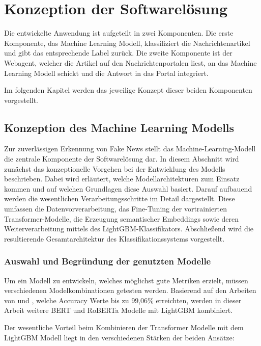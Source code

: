 \chapter{Konzeption der Softwarelösung}
\label{chap:konzeption_der_softwareloesung}

Die entwickelte Anwendung ist aufgeteilt in zwei Komponenten. Die erste Komponente, das Machine Learning Modell,
klassifiziert die Nachrichtenartikel und gibt das entsprechende Label zurück. Die zweite Komponente ist der Webagent, welcher
die Artikel auf den Nachrichtenportalen liest, an das Machine Learning Modell schickt und die Antwort in das Portal integriert.

Im folgenden Kapitel werden das jeweilige Konzept dieser beiden Komponenten vorgestellt.

\section{Konzeption des Machine Learning Modells} \label{sec:06:machine_learning_model}

Zur zuverlässigen Erkennung von Fake News stellt das Machine-Learning-Modell die zentrale Komponente der Softwarelösung dar.
In diesem Abschnitt wird zunächst das konzeptionelle Vorgehen bei der Entwicklung des Modells beschrieben. Dabei wird erläutert, welche Modellarchitekturen zum Einsatz kommen und 
auf welchen Grundlagen diese Auswahl basiert.
Darauf aufbauend werden die wesentlichen Verarbeitungsschritte im Detail dargestellt. Diese umfassen die Datenvorverarbeitung, 
das Fine-Tuning der vortrainierten Transformer-Modelle, die Erzeugung semantischer Embeddings sowie deren Weiterverarbeitung mittels des LightGBM-Klassifikators. 
Abschließend wird die resultierende Gesamtarchitektur des Klassifikationssystems vorgestellt.

\subsection{Auswahl und Begründung der genutzten Modelle} 

Um ein Modell zu entwickeln, welches möglichst gute Metriken erzielt, müssen verschiedenen Modelkombinationen getesten werden.
Basierend auf den Arbeiten von \cite{Essa:2023aa} und \cite{V_G_2024}, welche Accuracy Werte bis zu 99,06\% erreichten, werden in dieser Arbeit weitere BERT und RoBERTa
Modelle mit LightGBM kombiniert.

Der wesentliche Vorteil beim Kombinieren der Transformer Modelle mit dem LightGBM Modell liegt in den verschiedenen Stärken der beiden Ansätze:

